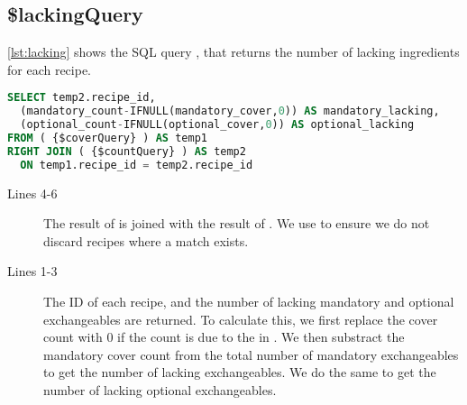 \subsection*{\$lackingQuery}
\autoref{lst:lacking} shows the SQL query , that returns the number of lacking ingredients for each recipe.
\begin{lstlisting}[language=SQL, morekeywords={IFNULL}, float=h, label={lst:lacking}, caption={\$lackingQuery, returns the number of lacking ingredients for each recipe.}]
SELECT temp2.recipe_id,
  (mandatory_count-IFNULL(mandatory_cover,0)) AS mandatory_lacking,
  (optional_count-IFNULL(optional_cover,0)) AS optional_lacking
FROM ( {$coverQuery} ) AS temp1
RIGHT JOIN ( {$countQuery} ) AS temp2
  ON temp1.recipe_id = temp2.recipe_id
\end{lstlisting}
\begin{description}
\item[Lines 4-6] The result of  is joined with the result of . We use  to ensure we do not discard recipes where a match exists. 
\item[Lines 1-3] The ID of each recipe, and the number of lacking mandatory and optional exchangeables are returned. To calculate this, we first replace the cover count with 0 if the count is  due to the  in . We then substract the mandatory cover count from the total number of mandatory exchangeables to get the number of lacking exchangeables. We do the same to get the number of lacking optional exchangeables.
\end{description}



